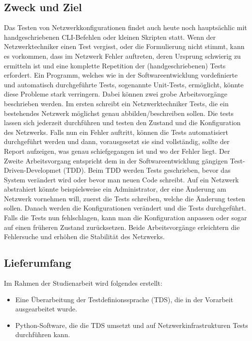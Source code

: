 \documentclass[
	ngerman,
	toc=listof, %
	toc=bibliography, %
	footnotes=multiple, %
	parskip=half, %
	numbers=noendperiod %
]{scrartcl}
\begin{document}
	\subsection{Zweck und Ziel}
		Das Testen von Netzwerkkonfigurationen findet auch heute noch hauptsächlic mit handgeschriebenen CLI-Befehlen oder kleinen Skripten statt. 
		Wenn der Netzwerktechniker einen Test vergisst, oder die Formulierung nicht stimmt,	kann es vorkommen, dass im Netzwerk Fehler auftreten, deren Ursprung schwierig zu ermitteln ist und eine komplette Repetition der (handgeschriebenen) Tests erfordert. 
		Ein Programm, welches wie in der Softwareentwicklung vordefinierte und automatisch durchgeführte Tests, sogenannte Unit-Tests, ermöglicht, könnte diese Probleme stark verringern.
		Dabei können zwei grobe Arbeitsvorgänge beschrieben werden. 
		Im ersten schreibt ein Netzwerktechniker Tests, die ein bestehendes Netzwerk möglichst genau abbilden/beschreiben sollen.
		Die tests lassen sich jederzeit durchführen und testen den Zustand und die Konfiguration des Netzwerks. 
		Falls nun ein Fehler auftritt, können die Tests automatisiert durchgeführt werden und dann, vorausgesetzt sie sind vollständig, sollte der Report aufzeigen, was genau schiefgegangen ist und wo der Fehler liegt.
		Der Zweite Arbeitsvorgang entspricht dem in der Softwareentwicklung gängigen Test-Driven-Developmet (TDD). 
		Beim TDD werden Tests geschrieben, bevor das System verändert wird oder bevor man neuen Code schreibt. 
		Auf ein Netzwerk abstrahiert könnte beispielsweise ein Administrator, der eine Änderung am Netzwerk vornehmen will, zuerst die Tests schreiben, welche die Änderung testen sollen. 
		Danach werden die Konfigurationen verändert und die Tests durchgeführt. 
		Falls die Tests nun fehlschlagen, kann man die Konfiguration anpassen oder sogar auf einen früheren Zustand zurücksetzen. 
		Beide Arbeitsvorgänge erleichtern die Fehlersuche und erhöhen die Stabilität des Netzwerks.	

	\subsection{Lieferumfang}
		Im Rahmen der Studienarbeit wird folgendes erstellt:
		\begin{itemize}
			\item Eine Überarbeitung der Testdefinionssprache (TDS), die in der Vorarbeit ausgearbeitet wurde.
			\item Python-Software, die die TDS umsetzt und auf Netzwerkinfrastrukturen Tests durchführen kann.
		\end{itemize}
\end{document}
